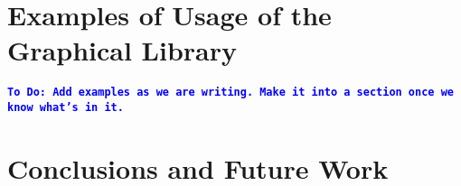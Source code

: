 \documentclass[12pt]{article}
\newcommand{\comment}[1]{{\bf \tt  {#1}}}
\newcommand{\todo}[1]{\textcolor{blue}{\comment{To Do: {#1}}}}
\begin{document}
\section{Examples of Usage of the Graphical Library}\label{sec:usage}
\todo{Add examples as we are writing.  Make it into a section once we know what's in it.}

\section{Conclusions and Future Work}\label{sec:future-work}


%
%

%  
%
%




\end{document}
